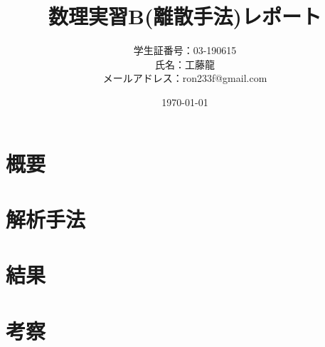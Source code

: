 \documentclass[11pt,a4paper]{jsarticle}
\title{数理実習B(離散手法)レポート}
\author{学生証番号：03-190615\\氏名：工藤龍\\メールアドレス：ron233f@gmail.com}
\date{\today}
\begin{document}
\maketitle

\section{概要}

\section{解析手法}

\section{結果}

\section{考察}
\end{document}
